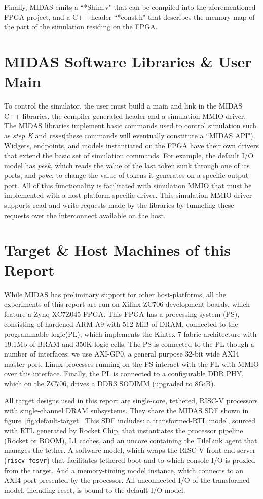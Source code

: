 Finally, MIDAS emits a ``*Shim.v" that can be compiled into the aforementioned
FPGA project, and a C++ header ``*const.h" that describes the memory map of the
part of the simulation residing on the FPGA.

\section{MIDAS Software Libraries \& User Main}

To control the simulator, the user must build a main and link in the MIDAS C++
libraries, the compiler-generated header and a simulation MMIO driver.  The
MIDAS libraries implement basic commands used to control simulation such as
\emph{step K} and \emph{reset}(these commands will eventually constitute a
``MIDAS API"). Widgets, endpoints, and models instantiated on the FPGA have
their own drivers that extend the basic set of simulation commands. For
example, the default I/O model has \emph{peek}, which reads the value of the
last token sunk through one of its ports, and \emph{poke}, to change the value
of tokens it generates on a specific output port.  All of this functionality is
facilitated with simulation MMIO that must be implemented with a host-platform
specific driver. This simulation MMIO driver supports read and write requests
made by the libraries by tunneling these requests over the interconnect available
on the host.

\section{Target \& Host Machines of this Report}\label{sec:targetandhostmachines}

While MIDAS has preliminary support for other host-platforms, all the
experiments of this report are run on Xilinx ZC706 development boards, which
feature a Zynq XC7Z045 FPGA. This FPGA has a processing system (PS),
consisting of hardened ARM A9 with 512 MiB of DRAM, connected to the
programmable logic(PL), which implements the Kintex-7 fabric architecture with
19.1Mb of BRAM and 350K logic cells. The PS is connected to the PL though a
number of interfaces; we use AXI-GP0, a general purpose 32-bit wide AXI4 master port.
Linux processes running on the PS interact with the PL with MMIO over this
interface. Finally, the PL is connected to a configurable DDR PHY, which on the
ZC706, drives a DDR3 SODIMM (upgraded to 8GiB).

All target designs used in this report are single-core, tethered, RISC-V
processors with single-channel DRAM subsystems.  They share the MIDAS SDF
shown in figure~\ref{fig:default-target}. This SDF includes: a transformed-RTL
model, sourced with RTL generated by Rocket Chip, that instantiates the
processor pipeline (Rocket or BOOM), L1 caches, and an uncore containing the
TileLink agent that manages the tether. A software model, which wraps the
RISC-V front-end server (\texttt{riscv-fesvr}) that facilitates tethered boot
and to which console I/O is proxied from the target. And a memory-timing
model instance, which connects to an AXI4 port presented by the processor.
All unconnected I/O of the transformed model, including reset, is bound to the
default I/O model.

